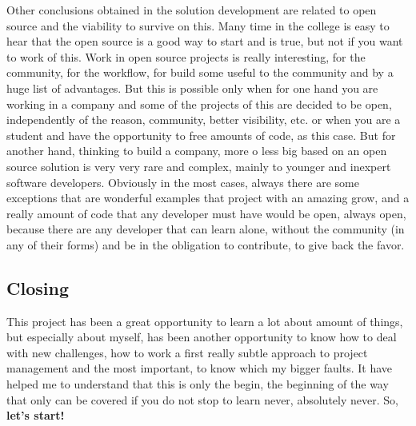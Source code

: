 Other conclusions obtained in the solution development are related to open source and the
viability to survive on this. Many time in the college is easy to hear that the
open source is a good way to start and is true, but not if you want to work of
this. Work in open source projects is really interesting, for the community,
for the workflow, for build some useful to the community and by a huge list of
advantages. But this is possible only when for one hand you are working in a
company and some of the projects of this are decided to be open, independently of the
reason, community, better visibility, etc. or when you are a student and have
the opportunity to free amounts of code, as this case. But for another hand,
thinking to build a company, more o less big based on an open source solution
is very very rare and complex, mainly to younger and inexpert software developers.
\intro
Obviously in the most cases, always there are some exceptions that are
wonderful examples that project with an amazing grow, and a really amount of
code that any developer must have would be open, always open, because there
are any developer that can learn alone, without the community (in any of their
forms) and be in the obligation to contribute, to give back the favor.

\subsection{Closing}
This project has been a great opportunity to learn a lot about amount of things,
but especially about myself, has been another opportunity to know how to deal with
new challenges, how to work a first really subtle approach to project management and
the most important, to know which my bigger faults.
It have helped me to understand that this is only the begin, the beginning of
the way that only can be covered if you do not stop to learn never, absolutely never.
\intro
So, \textbf{let's start!}
